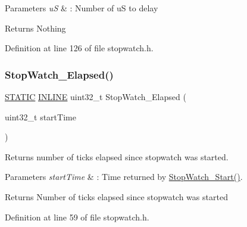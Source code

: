 \begin{DoxyParams}{Parameters}
{\em uS} & \+: Number of uS to delay \\
\hline
\end{DoxyParams}
\begin{DoxyReturn}{Returns}
Nothing 
\end{DoxyReturn}


Definition at line 126 of file stopwatch.\+h.

\mbox{\label{group___stop___watch_ga0a0b6b9a4391ae5f4fcccb22a2a35f73}} 
\subsubsection{\texorpdfstring{Stop\+Watch\+\_\+\+Elapsed()}{StopWatch\_Elapsed()}}
{\footnotesize\ttfamily \hyperlink{group___l_p_c___types___public___macros_ga10b2d890d871e1489bb02b7e70d9bdfb}{S\+T\+A\+T\+IC} \hyperlink{spifi__18xx__43xx_8h_a2eb6f9e0395b47b8d5e3eeae4fe0c116}{I\+N\+L\+I\+NE} uint32\+\_\+t Stop\+Watch\+\_\+\+Elapsed (\begin{DoxyParamCaption}\item[{uint32\+\_\+t}]{start\+Time }\end{DoxyParamCaption})}



Returns number of ticks elapsed since stopwatch was started. 


\begin{DoxyParams}{Parameters}
{\em start\+Time} & \+: Time returned by \hyperlink{group___stop___watch_ga0dbab611d6cbdd4faad5018131aca140}{Stop\+Watch\+\_\+\+Start()}. \\
\hline
\end{DoxyParams}
\begin{DoxyReturn}{Returns}
Number of ticks elapsed since stopwatch was started 
\end{DoxyReturn}


Definition at line 59 of file stopwatch.\+h.

\mbox{\label{group___stop___watch_gaa0f8ea277b700d20b4322a15d9ddf32c}} 
